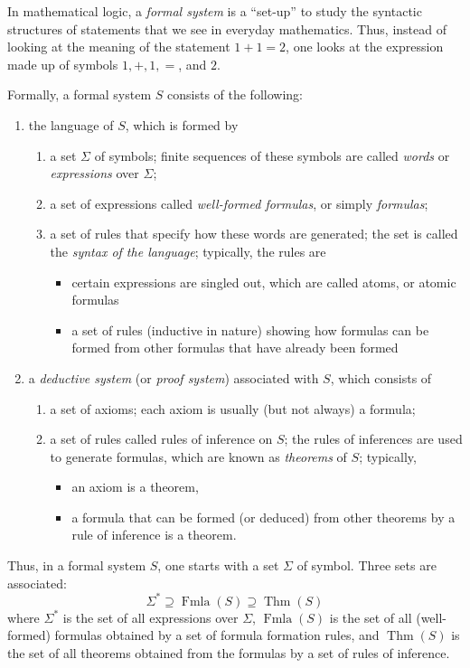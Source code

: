 \documentclass[12pt]{article}
\begin{document}
In mathematical logic, a \emph{formal system} is a ``set-up'' to study the syntactic structures of statements that we see in everyday mathematics.  Thus, instead of looking at the meaning of the statement $1+1=2$, one looks at the expression made up of symbols $1,+,1,=$, and $2$.

Formally, a formal system $S$ consists of the following:
\begin{enumerate}
\item the language of $S$, which is formed by 
\begin{enumerate}
\item a set $\Sigma$ of symbols; finite sequences of these symbols are called \emph{words} or \emph{expressions} over $\Sigma$;
\item a set of expressions called \emph{well-formed formulas}, or simply \emph{formulas}; 
\item a set of rules that specify how these words are generated; the set is called the \emph{syntax of the language}; typically, the rules are
\begin{itemize}
\item certain expressions are singled out, which are called atoms, or atomic formulas
\item a set of rules (inductive in nature) showing how formulas can be formed from other formulas that have already been formed
\end{itemize}
\end{enumerate}
\item a \emph{deductive system} (or \emph{proof system}) associated with $S$, which consists of
\begin{enumerate}
\item a set of axioms; each axiom is usually (but not always) a formula;
\item a set of rules called rules of inference on $S$; the rules of inferences are used to generate formulas, which are known as \emph{theorems} of $S$; typically, 
\begin{itemize}
\item an axiom is a theorem,
\item a formula that can be formed (or deduced) from other theorems by a rule of inference is a theorem.
\end{itemize}
\end{enumerate}
\end{enumerate}

Thus, in a formal system $S$, one starts with a set $\Sigma$ of symbol.  Three sets are associated: $$\Sigma^* \supseteq \operatorname{Fmla}(S) \supseteq \operatorname{Thm}(S)$$
where $\Sigma^*$ is the set of all expressions over $\Sigma$, $\operatorname{Fmla}(S)$ is the set of all (well-formed) formulas obtained by a set of formula formation rules, and $\operatorname{Thm}(S)$ is the set of all theorems obtained from the formulas by a set of rules of inference.
\end{document}
